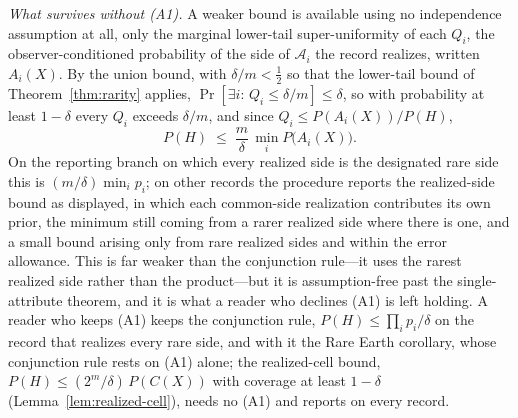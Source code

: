 \emph{What survives without (A1).} A weaker bound is available using no independence assumption at all, only the marginal lower-tail super-uniformity of each $Q_i$, the observer-conditioned probability of the side of $\mathcal{A}_i$ the record realizes, written $A_i(X)$. By the union bound, with $\delta/m < \tfrac12$ so that the lower-tail bound of Theorem~\ref{thm:rarity} applies, $\Pr[\exists i:\, Q_i \le \delta/m] \le \delta$, so with probability at least $1-\delta$ every $Q_i$ exceeds $\delta/m$, and since $Q_i \le P(A_i(X))/P(H)$,
\begin{equation}
\label{eq:union-bound}
P(H) \;\le\; \frac{m}{\delta}\,\min_i P\big(A_i(X)\big) .
\end{equation}
On the reporting branch on which every realized side is the designated rare side this is $(m/\delta)\min_i p_i$; on other records the procedure reports the realized-side bound as displayed, in which each common-side realization contributes its own prior, the minimum still coming from a rarer realized side where there is one, and a small bound arising only from rare realized sides and within the error allowance. This is far weaker than the conjunction rule---it uses the rarest realized side rather than the product---but it is assumption-free past the single-attribute theorem, and it is what a reader who declines (A1) is left holding. A reader who keeps (A1) keeps the conjunction rule, $P(H) \le \prod_i p_i/\delta$ on the record that realizes every rare side, and with it the Rare Earth corollary, whose conjunction rule rests on {\rm (A1)} alone; the realized-cell bound, $P(H) \le (2^m/\delta)\,P(C(X))$ with coverage at least $1-\delta$ (Lemma~\ref{lem:realized-cell}), needs no {\rm (A1)} and reports on every record. 

